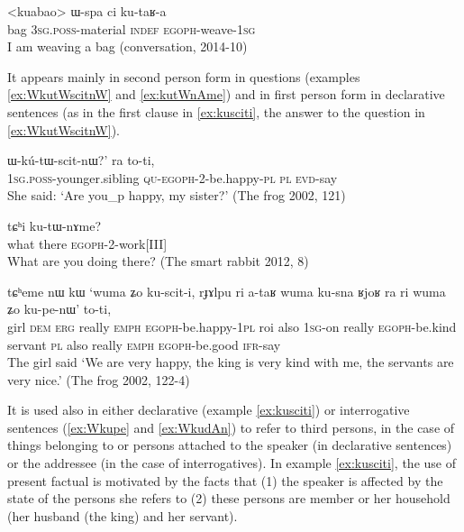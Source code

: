 \documentclass[oldfontcommands,oneside,a4paper,11pt]{article}
\newcommand{\ipa}[1]{{\phon \mbox{#1}}} %
\begin{document}
\begin{exe}
\ex \label{ex:kutaRa}
\gll 
<kuabao> 	\ipa{ɯ-spa}  	\ipa{ci}  	\ipa{ku-taʁ-a}  \\
bag \textsc{3sg.poss}-material \textsc{indef} \textsc{egoph}-weave-\textsc{1sg} \\
\glt I am weaving a bag (conversation, 2014-10)
\end{exe}

It appears mainly  in second person form in questions (examples \ref{ex:WkutWscitnW} and \ref{ex:kutWnAme}) and in first person form in declarative sentences (as in the first clause in \ref{ex:kusciti}, the answer to the question in \ref{ex:WkutWscitnW}).  

\begin{exe}
\ex \label{ex:WkutWscitnW}
\gll  \ipa{`a-ʁi} 			\ipa{ɯ-kú-tɯ-scit-nɯ?}' 	\ipa{ra} 	\ipa{to-ti,} \\
\textsc{1sg.poss}-younger.sibling  \textsc{qu-egoph}-2-be.happy-\textsc{pl} \textsc{pl} \textsc{evd}-say \\
\glt She said: `Are you_p happy, my sister?' (The frog 2002, 121)
\end{exe}

\begin{exe}
\ex \label{ex:kutWnAme}
\gll \ipa{nɯtɕu}  \ipa{tɕʰi} \ipa{ku-tɯ-nɤme?}\\
what there \textsc{egoph}-2-work[III] \\
\glt What are you doing there? (The smart rabbit 2012, 8)
\end{exe}
 
 
\begin{exe}
\ex \label{ex:kusciti}
\gll
\ipa{tɕʰeme} 	\ipa{nɯ} 	\ipa{kɯ} 	\ipa{`wuma} 	\ipa{ʑo} 	\ipa{ku-scit-i,} \ipa{rɟɤlpu} 	\ipa{ri} 	\ipa{a-taʁ} 	\ipa{wuma} 	\ipa{ku-sna} \ipa{ʁjoʁ} 	\ipa{ra} 	\ipa{ri} 	\ipa{wuma} 	\ipa{ʑo} 	\ipa{ku-pe-nɯ'} \ipa{to-ti,} \\
girl \textsc{dem} \textsc{erg} really \textsc{emph} \textsc{egoph}-be.happy-\textsc{1pl}  roi also \textsc{1sg}-on really \textsc{egoph}-be.kind servant \textsc{pl} also really \textsc{emph}   \textsc{egoph}-be.good \textsc{ifr}-say \\
\glt The girl said `We are very happy, the king is very kind with me, the servants are very nice.'
(The frog 2002, 122-4)
\end{exe}

It is used also in either declarative (example \ref{ex:kusciti}) or  interrogative sentences (\ref{ex:Wkupe} and \ref{ex:WkudAn}) to refer to third persons, in the case of things belonging to or persons attached to the speaker (in declarative sentences) or the addressee (in the case of interrogatives). In example \ref{ex:kusciti}, the  use of present factual is motivated by the facts that (1) the speaker is affected by the state of the persons she refers to (2) these persons are member or her household (her husband (the king) and her servant).
\end{document}
